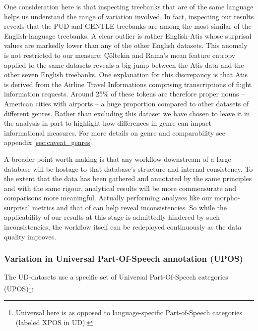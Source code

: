 \documentclass[USenglish]{article}
\begin{document}
One consideration here is that inspecting treebanks that are of the same language helps us understand the range of variation involved.
In fact, inspecting our results reveals that the PUD and GENTLE treebanks are among the most similar of the English-language treebanks.
A clear outlier is rather English-Atis whose surprisal values are markedly lower than any of the other English datasets.
This anomaly is not restricted to our measure: {\c{C}}{\"o}ltekin and Rama's mean feature entropy applied to the same datasets reveals a big jump between the Atis data and the other seven English treebanks.
One explanation for this discrepancy is that Atis is derived from the Airline Travel Informations comprising transcriptions of flight information requests.
Around 25\% of these tokens are therefore proper nouns -- American cities with airports -- a huge proportion compared to other datasets of different genres.
Rather than excluding this dataset we have chosen to leave it in the analysis in part to highlight how differences in genre can impact informational measures.
For more details on genre and comparability see appendix \ref{sec:caveat_genres}.

A broader point worth making is that any workflow downstream of a large database will be hostage to that database's structure and internal consistency. 
To the extent that the data has been gathered and annotated by the same principles and with the same rigour, analytical results will be more commensurate and comparisons more meaningful. 
Actually performing analyses like our morpho-surprisal metrics and that of \citet{ccoltekin2023complexity} can help reveal inconsistencies.
So while the applicability of our results at this stage is admittedly hindered by such inconsistencies, the workflow itself can be redeployed continuously as the data quality improves.
\FloatBarrier
\subsubsection{Variation in Universal Part-Of-Speech annotation (UPOS)}
\label{appendix_UPOS_variation_subclass}
The UD-datasets use a specific set of Universal Part-Of-Speech categories (UPOS)\footnote{Universal here is as opposed to language-specific Part-of-Speech categories (labeled XPOS in UD).}:
\end{document}
